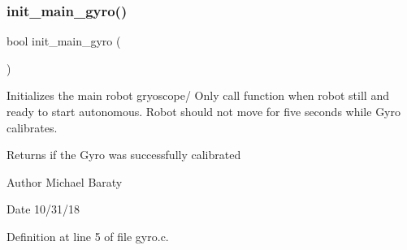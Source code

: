 \mbox{\label{gyro_8h_a47c0a78a867be91a28e278bf433d699c}} 
\subsubsection{init\+\_\+main\+\_\+gyro()}
{\footnotesize\ttfamily bool init\+\_\+main\+\_\+gyro (\begin{DoxyParamCaption}{ }\end{DoxyParamCaption})}



Initializes the main robot gryoscope/ Only call function when robot still and ready to start autonomous. Robot should not move for five seconds while Gyro calibrates. 

\begin{DoxyReturn}{Returns}
if the Gyro was successfully calibrated 
\end{DoxyReturn}
\begin{DoxyAuthor}{Author}
Michael Baraty 
\end{DoxyAuthor}
\begin{DoxyDate}{Date}
10/31/18 
\end{DoxyDate}


Definition at line 5 of file gyro.\+c.

